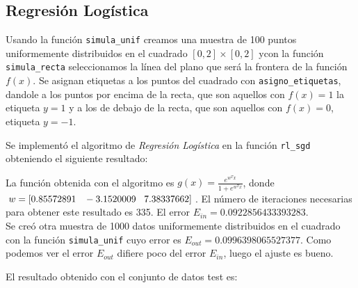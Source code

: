 \documentclass{article}
\begin{document}
\subsection{Regresión Logística}

Usando la función \texttt{simula\_unif} creamos una muestra de 100 puntos uniformemente distribuidos en el cuadrado $[0,2] \times [0,2]$ ycon la función \texttt{simula\_recta} seleccionamos la línea del plano que será la frontera de la función $f(x)$. Se asignan etiquetas a los puntos del cuadrado con \texttt{asigno\_etiquetas}, dandole a los puntos por encima de la recta, que son aquellos con $f(x)=1$ la etiqueta $y=1$ y a los de debajo de la recta, que son aquellos con $f(x)=0$, etiqueta $y=-1$.

Se implementó el algoritmo de \textit{Regresión Logística} en la función \texttt{rl\_sgd} obteniendo el siguiente resultado:

\begin{figure}[H]
  \centering
\end{figure}

La función obtenida con el algoritmo es $g(x)= \frac{e^{w^Tx}}{1+e^{w^Tx}}$, donde $w = [0.85572891 \hspace{3mm} -3.1520009 \hspace{3mm} 7.38337662]$. El número de iteraciones necesarias para obtener este resultado es 335. El error  $E_{in} = 0.0922856433393283$.\\

Se creó otra muestra de 1000 datos uniformemente distribuidos en el cuadrado con la función \texttt{simula\_unif} cuyo error es $E_{out} = 0.0996398065527377$. Como podemos ver el error $E_{out}$ difiere poco del error $E_{in}$, luego el ajuste es bueno.

El resultado obtenido con el conjunto de datos test es:
\end{document}
